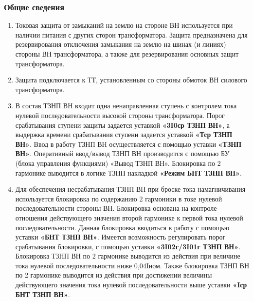 \color{black}

\subsubsection{Общие сведения}

\begin{enumerate}[label=\arabic{section}.\arabic{subsection}.\arabic{subsubsection}.\arabic*,  align=left, labelsep=4pt, leftmargin=0pt, itemindent=57pt]

\item
Токовая защита от замыканий на землю на стороне ВН используется при наличии питания с других
сторон трансформатора. Защита предназначена для резервирования отключения замыкания на землю
на шинах (и линиях) стороны ВН трансформатора, а также для резервирования основных защит
трансформатора.

\item
Защита подключается к ТТ, установленным со стороны обмоток ВН силового трансформатора.

\item
В состав ТЗНП ВН входит одна ненаправленная ступень с контролем тока нулевой
последовательности высокой стороны трансформатора. Порог срабатывания ступени защиты задается
уставкой \textbf{«3I0ср ТЗНП ВН»}, а выдержка времени срабатывания ступени задается уставкой \textbf{«Тср ТЗНП
ВН»}. Ввод в работу ТЗНП ВН осуществляется с помощью уставки \textbf{«ТЗНП ВН»}. Оперативный ввод/вывод
ТЗНП ВН производится с помощью БУ (блока управления функциями) «Вывод ТЗНП ВН». Блокировка по
2 гармонике выводится в логике ТЗНП накладкой \textbf{«Режим БНТ ТЗНП ВН»}.

\item
Для обеспечения несрабатывания ТЗНП ВН при броске тока намагничивания используется
блокировка по содержанию 2 гармоники в токе нулевой последовательности стороны ВН. Блокировка
основана на контроле отношения действующего значения второй гармонике к первой тока нулевой
последовательности. Данная блокировка вводиться в работу с помощью уставки \textbf{«БНТ ТЗНП ВН»}.
Имеется возможность регулировать порог срабатывания блокировки, с помощью уставки \textbf{«3I02г/3I01г
ТЗНП ВН»}. Блокировка ТЗНП ВН по 2 гармонике выводится из действия при величине тока нулевой
последовательности ниже 0,04Iном. Также блокировка ТЗНП ВН по 2 гармонике выводится из действия
при достижении величины действующего значения тока нулевой последовательности выше уставки \textbf{«Iср
БНТ ТЗНП ВН»}.


\end{enumerate}
